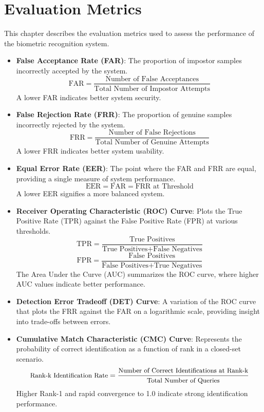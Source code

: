 \section{Evaluation Metrics}

This chapter describes the evaluation metrics used to assess the performance of the biometric recognition system.

\begin{itemize}

    \item \textbf{False Acceptance Rate (FAR)}:  
    The proportion of impostor samples incorrectly accepted by the system.  
    \[
    \text{FAR} = \frac{\text{Number of False Acceptances}}{\text{Total Number of Impostor Attempts}}
    \]
    A lower FAR indicates better system security.

    \item \textbf{False Rejection Rate (FRR)}:  
    The proportion of genuine samples incorrectly rejected by the system.  
    \[
    \text{FRR} = \frac{\text{Number of False Rejections}}{\text{Total Number of Genuine Attempts}}
    \]
    A lower FRR indicates better system usability.

    \item \textbf{Equal Error Rate (EER)}:  
    The point where the FAR and FRR are equal, providing a single measure of system performance.  
    \[
    \text{EER} = \text{FAR} = \text{FRR at Threshold}
    \]
    A lower EER signifies a more balanced system.

    \item \textbf{Receiver Operating Characteristic (ROC) Curve}:  
    Plots the True Positive Rate (TPR) against the False Positive Rate (FPR) at various thresholds.  
    \[
    \text{TPR} = \frac{\text{True Positives}}{\text{True Positives} + \text{False Negatives}}
    \]
    \[
    \text{FPR} = \frac{\text{False Positives}}{\text{False Positives} + \text{True Negatives}}
    \]
    The Area Under the Curve (AUC) summarizes the ROC curve, where higher AUC values indicate better performance.

    \item \textbf{Detection Error Tradeoff (DET) Curve}:  
    A variation of the ROC curve that plots the FRR against the FAR on a logarithmic scale, providing insight into trade-offs between errors.

    \item \textbf{Cumulative Match Characteristic (CMC) Curve}:  
    Represents the probability of correct identification as a function of rank in a closed-set scenario.  
    \begin{equation}
        \small
            \text{Rank-k Identification Rate} = 
            \frac{\text{Number of Correct Identifications at Rank-k}}
            {\text{Total Number of Queries}}
    \end{equation}
    Higher Rank-1 and rapid convergence to 1.0 indicate strong identification performance.


\end{itemize}
